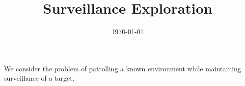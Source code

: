 \documentclass[11pt,english]{article}
\title{Surveillance Exploration}
\author{}
\date{\today}
\begin{document}
\maketitle

\newcommand{\proj}{\mathcal{P}}
\newcommand{\backproj}{\mathcal{Q}}



We consider the problem of patrolling a known environment while maintaining surveillance
of a target.







\end{document}
